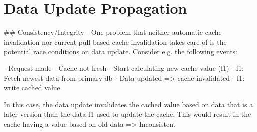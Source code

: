 \chapter{Data Update Propagation}
\label{subsec:data_update_propagation}

## Consistency/Integrity
- One problem that neither automatic cache invalidation nor current
  pull based cache invalidation takes care of is the potential race conditions
  on data update. Consider e.g. the following events:

- Request made
- Cache not fresh
- Start calculating new cache value (f1)
- f1: Fetch newest data from primary db
- Data updated => cache invalidated
- f1: write cached value

In this case, the data update invalidates the cached value based on data
that is a later version than the data f1 used to update the cache. This would
result in the cache having a value based on old data => Inconsistent


